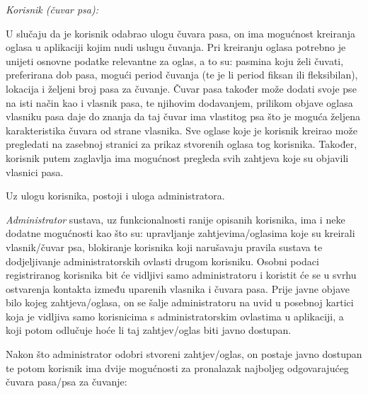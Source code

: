 		\textit{Korisnik (čuvar psa):}
		
		U slučaju da je korisnik odabrao ulogu čuvara pasa, on ima mogućnost kreiranja oglasa u aplikaciji kojim nudi uslugu čuvanja. Pri kreiranju oglasa potrebno je unijeti osnovne podatke relevantne za oglas, a to su: pasmina koju želi čuvati, preferirana dob pasa, mogući period čuvanja (te je li period fiksan ili fleksibilan), lokacija i željeni broj pasa za čuvanje. Čuvar pasa također može dodati svoje pse na isti način kao i vlasnik pasa, te njihovim dodavanjem, prilikom objave oglasa vlasniku pasa daje do znanja da taj čuvar ima vlastitog psa što je moguća željena karakteristika čuvara od strane vlasnika. Sve oglase koje je korisnik kreirao može pregledati na zasebnoj stranici za prikaz stvorenih oglasa tog korisnika. Također, korisnik putem zaglavlja ima mogućnost pregleda svih zahtjeva koje su objavili vlasnici pasa.
		
		Uz ulogu korisnika, postoji i uloga administratora.
		
		\textit{Administrator} sustava, uz funkcionalnosti ranije opisanih korisnika, ima i neke dodatne mogućnosti kao što su: upravljanje zahtjevima/oglasima koje su kreirali vlasnik/čuvar psa, blokiranje korisnika koji narušavaju pravila sustava te dodjeljivanje administratorskih ovlasti drugom korisniku. Osobni podaci registriranog korisnika bit će vidljivi samo administratoru i koristit će se u svrhu ostvarenja kontakta između uparenih vlasnika i čuvara pasa. Prije javne objave bilo kojeg zahtjeva/oglasa, on se šalje administratoru na uvid u posebnoj kartici koja je vidljiva samo korisnicima s administratorskim ovlastima u aplikaciji, a koji potom odlučuje hoće li taj zahtjev/oglas biti javno dostupan.
		
		Nakon što administrator odobri stvoreni zahtjev/oglas, on postaje javno dostupan te potom korisnik ima dvije mogućnosti za pronalazak najboljeg odgovarajućeg čuvara pasa/psa za čuvanje:
		
